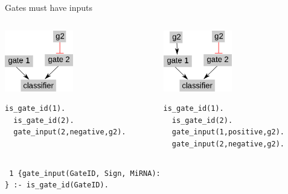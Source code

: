 \documentclass[10pt,dvipsnames]{beamer}
\begin{document}
\begin{frame}[fragile]{Gates must have inputs}
 \begin{columns}  
 \begin{column}{0.5\textwidth}
 \begin{center}\includegraphics[width=3cm]{constraints_01.png}\end{center}
 \color{my_example_color}
 \begin{Verbatim}[fontsize=\small]
  is_gate_id(1).
  is_gate_id(2).
  gate_input(2,negative,g2).
 \end{Verbatim}
 \end{column}
 \begin{column}{0.5\textwidth}
 \begin{center}\includegraphics[width=3cm]{constraints_02.png}\end{center}
 \color{my_example_color}
 \begin{Verbatim}[fontsize=\small]
  is_gate_id(1).
  is_gate_id(2).
  gate_input(1,positive,g2).
  gate_input(2,negative,g2).
 \end{Verbatim}
 \end{column}
 \end{columns}
 \vspace{1cm}
 \texttt{
 1 \{gate\_input(GateID, Sign, MiRNA):\\
  \} :- is\_gate\_id(GateID).
 }
 
\end{frame}
\end{document}
